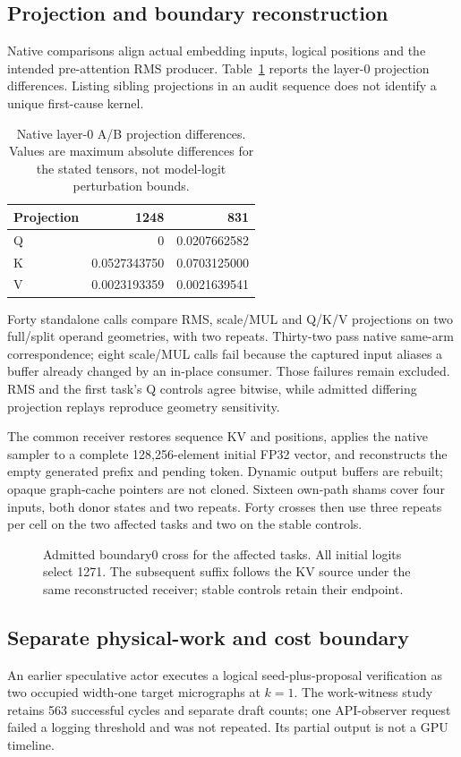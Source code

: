 \subsection{Projection and boundary reconstruction}
Native comparisons align actual embedding inputs, logical positions and the intended pre-attention RMS producer. Table~\ref{tab:projection} reports the layer-0 projection differences. Listing sibling projections in an audit sequence does not identify a unique first-cause kernel.
\begin{table}[t]\centering\small
\caption{Native layer-0 A/B projection differences. Values are maximum absolute differences for the stated tensors, not model-logit perturbation bounds.}
\label{tab:projection}
\begin{tabular}{@{}lrr@{}}\toprule
Projection&1248&831\\\midrule
Q&0&0.0207662582\\
K&0.0527343750&0.0703125000\\
V&0.0023193359&0.0021639541\\\bottomrule
\end{tabular}
\end{table}
Forty standalone calls compare RMS, scale/MUL and Q/K/V projections on two full/split operand geometries, with two repeats. Thirty-two pass native same-arm correspondence; eight scale/MUL calls fail because the captured input aliases a buffer already changed by an in-place consumer. Those failures remain excluded. RMS and the first task's Q controls agree bitwise, while admitted differing projection replays reproduce geometry sensitivity.

The common receiver restores sequence KV and positions, applies the native sampler to a complete 128,256-element initial FP32 vector, and reconstructs the empty generated prefix and pending token. Dynamic output buffers are rebuilt; opaque graph-cache pointers are not cloned. Sixteen own-path shams cover four inputs, both donor states and two repeats. Forty crosses then use three repeats per cell on the two affected tasks and two on the stable controls.
\begin{figure}[t]\centering\resizebox{\columnwidth}{!}{}
\caption{Admitted boundary0 cross for the affected tasks. All initial logits select 1271. The subsequent suffix follows the KV source under the same reconstructed receiver; stable controls retain their endpoint.}\label{fig:state}
\end{figure}

\subsection{Separate physical-work and cost boundary}
An earlier speculative actor executes a logical seed-plus-proposal verification as two occupied width-one target micrographs at $k=1$. The work-witness study retains 563 successful cycles and separate draft counts; one API-observer request failed a logging threshold and was not repeated. Its partial output is not a GPU timeline.

